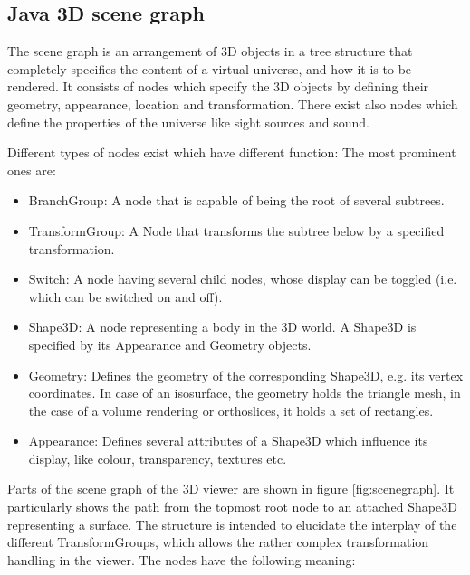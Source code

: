 \documentclass[a4paper,10pt]{article}
\begin{document}
\subsection*{Java 3D scene graph}
The scene graph is an arrangement of 3D objects in a tree structure that completely specifies the content of a virtual universe, and how it is to be rendered. It consists of nodes which specify the 3D objects by defining their geometry, appearance, location and transformation. There exist also nodes which define the properties of the universe like sight sources and sound. \cite{java3dtut}

Different types of nodes exist which have different function: The most prominent ones are:
\begin{itemize}
\item BranchGroup: A node that is capable of being the root of several subtrees.
\item TransformGroup: A Node that transforms the subtree below by a specified transformation.
\item Switch: A node having several child nodes, whose display can be toggled (i.e. which can be switched on and off).
\item Shape3D: A node representing a body in the 3D world. A Shape3D is specified by its Appearance and Geometry objects.
\item Geometry: Defines the geometry of the corresponding Shape3D, e.g. its vertex coordinates. In case of an isosurface, the geometry holds the triangle mesh, in the case of a volume rendering or orthoslices, it holds a set of rectangles.
\item Appearance: Defines several attributes of a Shape3D which influence its display, like colour, transparency, textures etc.
\end{itemize}

Parts of the scene graph of the 3D viewer are shown in figure \ref{fig:scenegraph}. It particularly shows the path from the topmost root node to an attached Shape3D representing a surface. The structure is intended to elucidate the interplay of the different TransformGroups, which allows the rather complex transformation handling in the viewer. The nodes have the following meaning:
\end{document}

